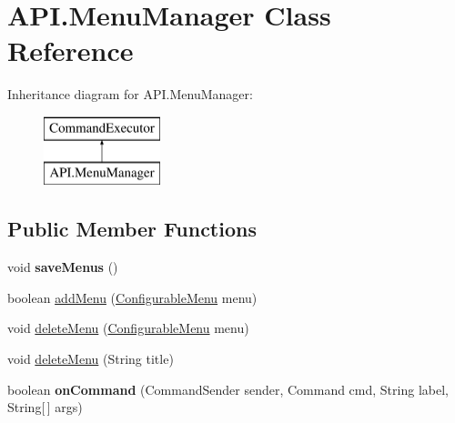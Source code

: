 \hypertarget{class_a_p_i_1_1_menu_manager}{}\section{A\+P\+I.\+Menu\+Manager Class Reference}
\label{class_a_p_i_1_1_menu_manager}
Inheritance diagram for A\+P\+I.\+Menu\+Manager\+:\begin{figure}[H]
\begin{center}
\leavevmode
\includegraphics[height=2.000000cm]{class_a_p_i_1_1_menu_manager}
\end{center}
\end{figure}
\subsection*{Public Member Functions}
\begin{DoxyCompactItemize}
\item 
\mbox{\label{class_a_p_i_1_1_menu_manager_a340fe9d00b3837983d5d2979e99d8c7f}} 
void {\bfseries save\+Menus} ()
\item 
boolean \hyperlink{class_a_p_i_1_1_menu_manager_a19ba30dd360343792e18b81b621b1a1b}{add\+Menu} (\hyperlink{class_a_p_i_1_1_configurable_menu}{Configurable\+Menu} menu)
\item 
void \hyperlink{class_a_p_i_1_1_menu_manager_a171c35c1ecde734a3f145db60cd02ea4}{delete\+Menu} (\hyperlink{class_a_p_i_1_1_configurable_menu}{Configurable\+Menu} menu)
\item 
void \hyperlink{class_a_p_i_1_1_menu_manager_ae91bcce56f83bdfe318b23521ec19c3d}{delete\+Menu} (String title)
\item 
\mbox{\label{class_a_p_i_1_1_menu_manager_a3158467b1e48c0cf367b0dc7abf5e0f8}} 
boolean {\bfseries on\+Command} (Command\+Sender sender, Command cmd, String label, String\mbox{[}$\,$\mbox{]} args)
\end{DoxyCompactItemize}
